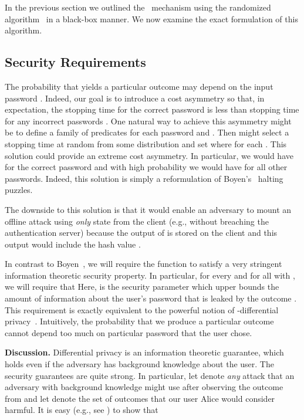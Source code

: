 In the previous section we outlined the \clientcash~mechanism using the randomized algorithm \selpred~in a black-box manner. We now examine the 
exact formulation of this algorithm.

\subsection{Security Requirements}
The probability that  yields a particular outcome  may depend on the input password . Indeed, our goal is to introduce a cost asymmetry so that, in expectation, the stopping time  for the correct password is less than stopping time  for any incorrect passwords . One natural way to achieve this asymmetry might be to define a family of predicates 
for each password  and . Then  might select a stopping time  at random from some distribution and set  where  for each . This solution could provide an extreme cost asymmetry. In particular, we would have  for the correct password and with high probability we would have  for all other passwords. Indeed, this solution is simply a reformulation of Boyen's~\cite{boyen2007halting} halting puzzles.  

The downside to this solution is that it would enable an adversary to mount an offline attack using {\em only} state from the client (e.g., without breaching the authentication server) because the output  of  is stored on the client and this output would include the hash value . 

In contrast to Boyen~\cite{boyen2007halting}, we will require the  function to satisfy a very stringent information theoretic security property. In particular, for every  and for all  with , we will require that 
Here,  is the security parameter which upper bounds the amount of information about the user's password that is leaked by the outcome .  This requirement is exactly equivalent to the powerful notion of -differential privacy~\cite{dwork2006calibrating}. Intuitively, the probability that we produce a particular outcome  cannot depend too much on particular password  that the user chose. 

{\bf Discussion.} Differential privacy is an information theoretic guarantee, which holds even if the adversary has background knowledge about the user. The security guarantees are quite strong. In particular, let  denote {\em any} attack that an adversary with background knowledge  might use after observing the outcome  from  and let  denote the set of outcomes that our user Alice would consider harmful. It is easy (e.g., see \cite{dwork2013algorithmic}) to show that 

